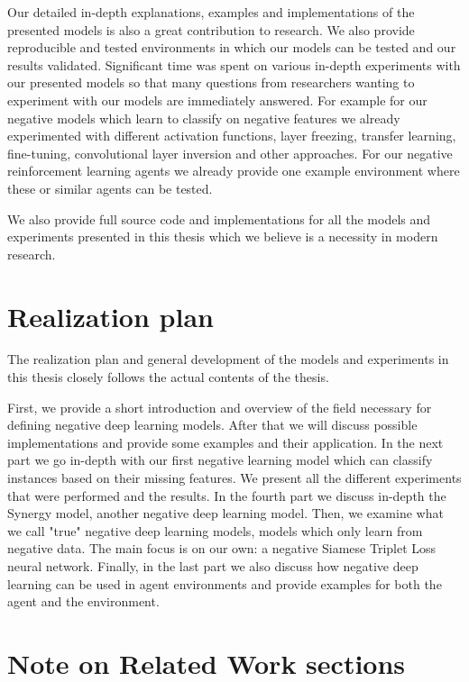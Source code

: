 \documentclass[b5paper]{book}
\begin{document}
Our detailed in-depth explanations, examples and implementations of the presented models is also a great contribution to research. We also provide reproducible and tested environments in which our models can be tested and our results validated. Significant time was spent on various in-depth experiments with our presented models so that many questions from researchers wanting to experiment with our models are immediately answered. For example for our negative models which learn to classify on negative features we already experimented with different activation functions, layer freezing, transfer learning, fine-tuning, convolutional layer inversion and other approaches. For our negative reinforcement learning agents we already provide one example environment where these or similar agents can be tested.

We also provide full source code and implementations for all the models and experiments presented in this thesis which we believe is a necessity in modern research.

\section{Realization plan}

The realization plan and general development of the models and experiments in this thesis closely follows the actual contents of the thesis.

First, we provide a short introduction and overview of the field necessary for defining negative deep learning models. After that we will discuss possible implementations and provide some examples and their application. In the next part we go in-depth with our first negative learning model which can classify instances based on their missing features. We present all the different experiments that were performed and the results. In the fourth part we discuss in-depth the Synergy model, another negative deep learning model. Then, we examine what we call "true" negative deep learning models, models which only learn from negative data. The main focus is on our own: a negative Siamese Triplet Loss neural network. Finally, in the last part we also discuss how negative deep learning can be used in agent environments and provide examples for both the agent and the environment.

\section{Note on Related Work sections}
\end{document}
